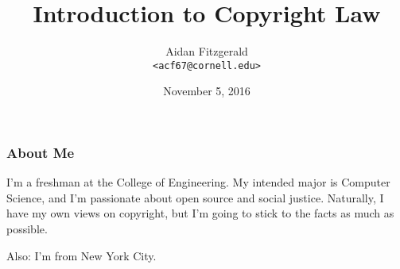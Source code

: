 \documentclass{beamer}
\title[Intro to Copyright]{Introduction to Copyright Law}
\author{
Aidan Fitzgerald \\
\texttt{<acf67@cornell.edu>}
}
\date{November 5, 2016}
\begin{document}
\begin{frame}
  \titlepage
\end{frame}

\begin{frame}
  \frametitle{About Me}

  I'm a freshman at the College of Engineering.
  My intended major is Computer Science, and I'm passionate about open source
  and social justice. Naturally, I have my own views on copyright, but I'm going
  to stick to the facts as much as possible.

  Also: I'm from New York City.
\end{frame}
\end{document}
